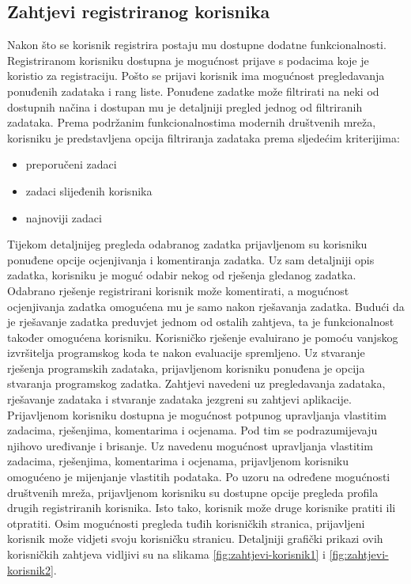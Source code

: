 \documentclass[times, utf8, zavrsni, numeric]{fer}
\begin{document}
			\subsection{Zahtjevi registriranog korisnika}
			Nakon što se korisnik registrira postaju mu dostupne dodatne funkcionalnosti. Registriranom korisniku dostupna je mogućnost prijave s podacima koje je koristio za registraciju. Pošto se prijavi korisnik ima mogućnost pregledavanja ponuđenih zadataka i rang liste. Ponuđene zadatke može filtrirati na neki od dostupnih načina i dostupan mu je detaljniji pregled jednog od filtriranih zadataka. Prema podržanim funkcionalnostima modernih društvenih mreža, korisniku je predstavljena opcija filtriranja zadataka prema sljedećim kriterijima: 
			\begin{itemize}
				\item preporučeni zadaci
				\item zadaci slijeđenih korisnika
				\item najnoviji zadaci
			\end{itemize}
			Tijekom detaljnijeg pregleda odabranog zadatka prijavljenom su korisniku ponuđene opcije ocjenjivanja i komentiranja zadatka. Uz sam detaljniji opis zadatka, korisniku je moguć odabir nekog od rješenja gledanog zadatka. Odabrano rješenje registrirani korisnik može komentirati, a mogućnost ocjenjivanja zadatka omogućena mu je samo nakon rješavanja zadatka. Budući da je rješavanje zadatka preduvjet jednom od ostalih zahtjeva, ta je funkcionalnost također omogućena korisniku. Korisničko rješenje evaluirano je pomoću vanjskog izvršitelja programskog koda te nakon evaluacije spremljeno. Uz stvaranje rješenja programskih zadataka, prijavljenom korisniku ponuđena je opcija stvaranja programskog zadatka. Zahtjevi navedeni uz pregledavanja zadataka, rješavanje zadataka i stvaranje zadataka jezgreni su zahtjevi aplikacije.\\ Prijavljenom korisniku dostupna je mogućnost potpunog upravljanja vlastitim zadacima, rješenjima, komentarima i ocjenama. Pod tim se podrazumijevaju njihovo uređivanje i brisanje. Uz navedenu mogućnost upravljanja vlastitim zadacima, rješenjima, komentarima i ocjenama, prijavljenom korisniku omogućeno je mijenjanje vlastitih podataka. Po uzoru na određene mogućnosti društvenih mreža, prijavljenom korisniku su dostupne opcije pregleda profila drugih registriranih korisnika. Isto tako, korisnik može druge korisnike pratiti ili otpratiti. Osim mogućnosti pregleda tuđih korisničkih stranica, prijavljeni korisnik može vidjeti svoju korisničku stranicu. Detaljniji grafički prikazi ovih korisničkih zahtjeva vidljivi su na slikama \ref{fig:zahtjevi-korisnik1} i \ref{fig:zahtjevi-korisnik2}.
\end{document}
